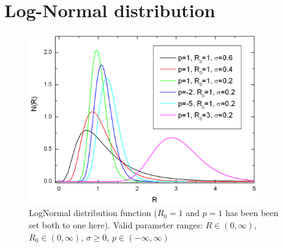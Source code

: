 
\clearpage
\section{Log-Normal distribution}
\label{sect:LogNormSD}
\begin{figure}[htb]
\begin{center}
\includegraphics[width=0.878\textwidth]{LogNorm.png}
\end{center}
\caption{LogNormal distribution function ($R_0=1$ and $p=1$ has
been been set both to one here). Valid parameter ranges: $R \in
(0,\infty)$, $R_0 \in (0,\infty)$, $\sigma\geq 0$, $p \in
(-\infty,\infty)$} \label{fig:LogNormal}
\end{figure}

